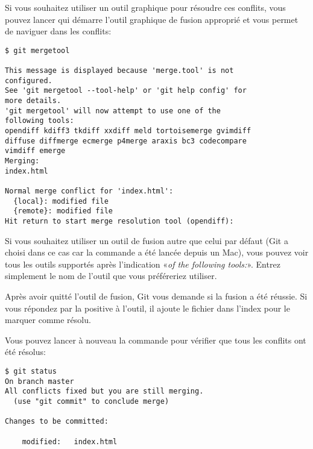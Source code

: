 Si vous souhaitez utiliser un outil graphique pour résoudre ces conflits, vous pouvez lancer  qui démarre l'outil graphique de fusion approprié et vous permet de naviguer dans les conflits:
\begin{Schunk}
\begin{Verbatim}
$ git mergetool

This message is displayed because 'merge.tool' is not
configured.
See 'git mergetool --tool-help' or 'git help config' for
more details.
'git mergetool' will now attempt to use one of the
following tools:
opendiff kdiff3 tkdiff xxdiff meld tortoisemerge gvimdiff
diffuse diffmerge ecmerge p4merge araxis bc3 codecompare
vimdiff emerge
Merging:
index.html

Normal merge conflict for 'index.html':
  {local}: modified file
  {remote}: modified file
Hit return to start merge resolution tool (opendiff):
\end{Verbatim}
\end{Schunk}

Si vous souhaitez utiliser un outil de fusion autre que celui par défaut (Git a choisi  dans ce cas car la commande a été lancée depuis un Mac), vous pouvez voir tous les outils supportés après l'indication «\emph{of the following tools:}».
Entrez simplement le nom de l'outil que vous préféreriez utiliser.


Après avoir quitté l'outil de fusion, Git vous demande si la fusion a été réussie.
Si vous répondez par la positive à l'outil, il ajoute le fichier dans l'index pour le marquer comme résolu.

Vous pouvez lancer à nouveau la commande  pour vérifier que tous les conflits ont été résolus:
\begin{Schunk}
\begin{Verbatim}
$ git status
On branch master
All conflicts fixed but you are still merging.
  (use "git commit" to conclude merge)

Changes to be committed:

    modified:   index.html
\end{Verbatim}
\end{Schunk}

